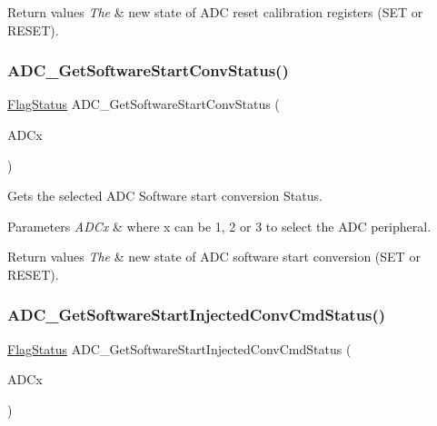 \begin{DoxyRetVals}{Return values}
{\em The} & new state of A\+DC reset calibration registers (S\+ET or R\+E\+S\+ET). \\
\hline
\end{DoxyRetVals}
\mbox{\label{group___a_d_c___private___functions_gaf1119583782ecbcec380efcb7eb74883}} 
\subsubsection{\texorpdfstring{ADC\_GetSoftwareStartConvStatus()}{ADC\_GetSoftwareStartConvStatus()}}
{\footnotesize\ttfamily \mbox{\hyperlink{group___exported__types_ga89136caac2e14c55151f527ac02daaff}{Flag\+Status}} A\+D\+C\+\_\+\+Get\+Software\+Start\+Conv\+Status (\begin{DoxyParamCaption}\item[{\mbox{\hyperlink{struct_a_d_c___type_def}{A\+D\+C\+\_\+\+Type\+Def}} $\ast$}]{A\+D\+Cx }\end{DoxyParamCaption})}



Gets the selected A\+DC Software start conversion Status. 


\begin{DoxyParams}{Parameters}
{\em A\+D\+Cx} & where x can be 1, 2 or 3 to select the A\+DC peripheral. \\
\hline
\end{DoxyParams}

\begin{DoxyRetVals}{Return values}
{\em The} & new state of A\+DC software start conversion (S\+ET or R\+E\+S\+ET). \\
\hline
\end{DoxyRetVals}
\mbox{\label{group___a_d_c___private___functions_ga8765f8835b8cfed13dce3d8d71767dcc}} 
\subsubsection{\texorpdfstring{ADC\_GetSoftwareStartInjectedConvCmdStatus()}{ADC\_GetSoftwareStartInjectedConvCmdStatus()}}
{\footnotesize\ttfamily \mbox{\hyperlink{group___exported__types_ga89136caac2e14c55151f527ac02daaff}{Flag\+Status}} A\+D\+C\+\_\+\+Get\+Software\+Start\+Injected\+Conv\+Cmd\+Status (\begin{DoxyParamCaption}\item[{\mbox{\hyperlink{struct_a_d_c___type_def}{A\+D\+C\+\_\+\+Type\+Def}} $\ast$}]{A\+D\+Cx }\end{DoxyParamCaption})}



